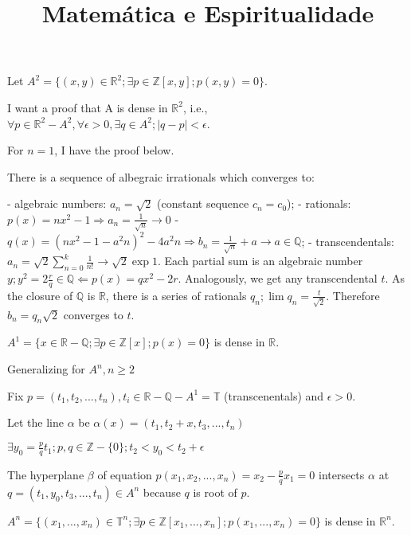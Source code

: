 \documentclass[10pt,a4paper]{article}
\title{Matem\'atica e Espiritualidade}
\date{}
\begin{document}
Let $A^2 = \{(x,y) \in \mathbb{R}^2; \exists p \in \mathbb{Z}[x, y] ; p(x,y) = 0\}$.

I want a proof that A is dense in $\mathbb{R}^2$, i.e., $\forall p \in \mathbb{R}^2 - A^2, \forall \epsilon > 0, \exists q \in A^2 ; |q - p| < \epsilon$.

For $n = 1$, I have the proof below.

There is a sequence of albegraic irrationals which converges to:

 - algebraic numbers: $a_n = \sqrt{2}$ (constant sequence $c_n = c_0$);
 - rationals: $p(x) = nx^2 - 1 \Rightarrow a_n = \frac{1}{\sqrt{n}} \rightarrow 0$
 - $q(x) = (nx^2 -1 - a^2n)^2 - 4a^2n \Rightarrow b_n = \frac{1}{\sqrt{n}} + a \rightarrow a \in \mathbb{Q}$;
 - transcendentals: $a_n = \sqrt{2} \sum_{n = 0}^k \frac{1}{n!} \rightarrow \sqrt{2} \exp 1$. Each partial sum is an algebraic number $y ; y^2 = 2\frac{r}{q} \in \mathbb{Q} \Leftarrow p(x) = qx^2 - 2r$. Analogously, we get any transcendental $t$. As the closure of $\mathbb{Q}$ is $\mathbb{R}$, there is a series of rationals $q_n ; \lim q_n = \frac{t}{\sqrt{2}}$. Therefore $b_n = q_n \sqrt{2}$ converges to $t$.

$A^1 = \{x \in \mathbb{R} - \mathbb{Q}; \exists p \in \mathbb{Z}[x] ; p(x) = 0\}$ is dense in $\mathbb{R}$.

Generalizing for $A^n, n \ge 2$

Fix $p = (t_1, t_2, ..., t_n), t_i \in \mathbb{R} - \mathbb{Q} - A^1 = \mathbb{T}$ (transcenentals) and $\epsilon > 0$.

Let the line $\alpha$ be $\alpha(x) = (t_1, t_2 + x, t_3, ..., t_n)$

$\exists y_0 = \frac{p}{q} t_1 ; p, q \in \mathbb{Z} - \{0\} ; t_2 < y_0 < t_2 + \epsilon$

The hyperplane $\beta$ of equation $p(x_1, x_2, ..., x_n) = x_2 - \frac{p}{q} x_1 = 0$ intersects $\alpha$ at $q = (t_1, y_0, t_3, ..., t_n) \in A^n$ because $q$ is root of $p$.

$A^n = \{(x_1, ..., x_n) \in \mathbb{T}^n; \exists p \in \mathbb{Z}[x_1, ..., x_n] ; p(x_1, ..., x_n) = 0\}$ is dense in $\mathbb{R}^n$.
\end{document}
